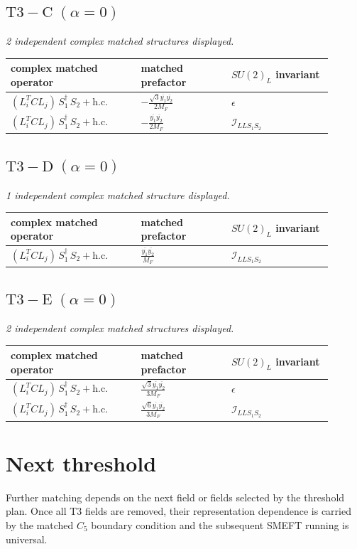 \documentclass[9pt]{article}
\begin{document}
\subsection*{$ \mathrm{T3-C}\;(\alpha=0) $}
\textit{2 independent complex matched structures displayed. }
\begin{longtable}{@{}p{0.36\linewidth}p{0.25\linewidth}p{0.29\linewidth}@{}}
\toprule
complex matched operator & matched prefactor & $SU(2)_L$ invariant \\
\midrule
$ (L_i^T C L_j)\,S_1^\dagger\,S_2+\mathrm{h.c.} $ & $ - \frac{\sqrt{3} \overline{y_{1}} \overline{y_{2}}}{2 M_F} $ & $ \epsilon $ \\
$ (L_i^T C L_j)\,S_1^\dagger\,S_2+\mathrm{h.c.} $ & $ - \frac{\overline{y_{1}} \overline{y_{2}}}{2 M_F} $ & $ \mathcal{I}_{LLS_1S_2} $ \\
\bottomrule
\end{longtable}
\subsection*{$ \mathrm{T3-D}\;(\alpha=0) $}
\textit{1 independent complex matched structure displayed. }
\begin{longtable}{@{}p{0.36\linewidth}p{0.25\linewidth}p{0.29\linewidth}@{}}
\toprule
complex matched operator & matched prefactor & $SU(2)_L$ invariant \\
\midrule
$ (L_i^T C L_j)\,S_1^\dagger\,S_2+\mathrm{h.c.} $ & $ \frac{\overline{y_{1}} \overline{y_{2}}}{M_F} $ & $ \mathcal{I}_{LLS_1S_2} $ \\
\bottomrule
\end{longtable}
\subsection*{$ \mathrm{T3-E}\;(\alpha=0) $}
\textit{2 independent complex matched structures displayed. }
\begin{longtable}{@{}p{0.36\linewidth}p{0.25\linewidth}p{0.29\linewidth}@{}}
\toprule
complex matched operator & matched prefactor & $SU(2)_L$ invariant \\
\midrule
$ (L_i^T C L_j)\,S_1^\dagger\,S_2+\mathrm{h.c.} $ & $ \frac{\sqrt{3} \overline{y_{1}} \overline{y_{2}}}{3 M_F} $ & $ \epsilon $ \\
$ (L_i^T C L_j)\,S_1^\dagger\,S_2+\mathrm{h.c.} $ & $ \frac{\sqrt{6} \overline{y_{1}} \overline{y_{2}}}{3 M_F} $ & $ \mathcal{I}_{LLS_1S_2} $ \\
\bottomrule
\end{longtable}
\section*{Next threshold}
Further matching depends on the next field or fields selected by the threshold plan.  Once all T3 fields are removed, their representation dependence is carried by the matched $C_5$ boundary condition and the subsequent SMEFT running is universal.
\end{document}
